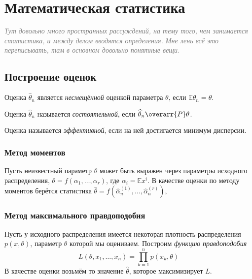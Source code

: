 \chapter{Математическая статистика}

\textcolor{gray}{\textit{Тут довольно много пространных рассуждений, на тему того, чем занимается
статистика, и между делом вводятся определения.
Мне лень всё это переписывать, там в основном довольно понятные вещи.}}

\section{Построение оценок}

\begin{definition}
    Оценка $ \hat\theta_n $ является \emph{несмещённой} оценкой параметра $ \theta $, если
    $ \mathbb E \hat \theta_n = \theta $.
\end{definition}

\begin{definition}
    Оценка $ \hat\theta_n $ называется \emph{состоятельной}, если
    $ \hat\theta_n \overarr{P} \theta $.
\end{definition}

\begin{definition}
    Оценка называется \emph{эффективной}, если на ней достигается минимум дисперсии.
\end{definition}

\subsection{Метод моментов}

Пусть неизвестный параметр $ \theta $ может быть выражен через параметры исходного распределения,
\ie $ \theta = f(\alpha_1, \dots, \alpha_r) $, где $ \alpha_i = \mathbb E x^i $.
В качестве оценки по методу моментов берётся статистика
$ \hat\theta = f(\hat\alpha_n^{(1)}, \dots, \hat\alpha_n^{(r)}) $,

\subsection{Метод максимального правдоподобия}

Пусть у исходного распределения имеется некоторая плотность распределения $ p(x, \theta) $, параметр
$ \theta $ которой мы оцениваем.
Построим \emph{функцию правдоподобия}
$$ L(\theta, x_1, \dots, x_n) = \prod_{k = 1}^n p(x_k, \theta) $$
В качестве оценки возьмём то значение $ \hat\theta $, которое максимизирует $ L $.

